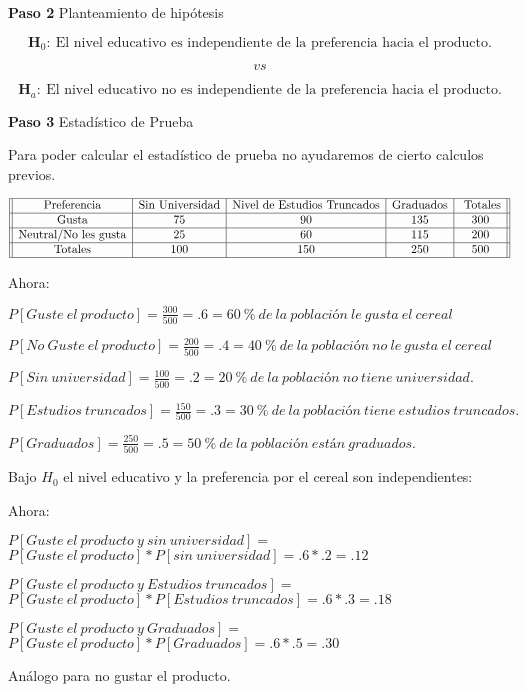 \documentclass[
  a4paper,
  oneside,
  openany]{book}
\begin{document}
\textbf{Paso 2} Planteamiento de hipótesis

\[\textbf{H}_0: \ \mbox{El nivel educativo es independiente de la preferencia hacia el producto.}\]

\[vs\]

\[\textbf{H}_a:\ \mbox{El nivel educativo no es independiente de la preferencia hacia el producto.}\]

\textbf{Paso 3} Estadístico de Prueba

Para poder calcular el estadístico de prueba no ayudaremos de cierto calculos previos.

\[
\begin{array}{||c| c| c |c |c||} 
\hline 
\mbox{Preferencia}& \mbox{Sin Universidad}&\mbox{Nivel de Estudios Truncados}&\mbox{Graduados} &\mbox{ Totales} \\  
 \hline
\mbox{Gusta}&75&90&135&300\\
 \hline
\mbox{Neutral/No les gusta}&25&60&115&200\\
 \hline
\mbox{Totales}&100&150&250&500\\
 \hline
\end{array}
\]

Ahora:

\(P[Guste\ el\ producto]= \frac{300}{500}=.6= 60\ \%\ de\ la\ población\ le\ gusta\ el\ cereal\)

\(P[No\ Guste\ el\ producto]= \frac{200}{500}=.4= 40\ \%\ de\ la\ población\ no\ le\ gusta\ el\ cereal\)

\(P[Sin\ universidad]= \frac{100}{500}=.2= 20\ \%\ de\ la\ población\ no\ tiene\ universidad.\)

\(P[Estudios\ truncados]= \frac{150}{500}=.3= 30\ \%\ de\ la\ población\ tiene\ estudios\ truncados.\)

\(P[Graduados]= \frac{250}{500}=.5= 50\ \%\ de\ la\ población\ están\ graduados.\)

Bajo \(H_0\) el nivel educativo y la preferencia por el cereal son independientes:

Ahora:

\(P[Guste\ el\ producto\ y\ sin\ universidad]=\)
\(P[Guste\ el\ producto]*P[sin\ universidad]=.6*.2=.12\)

\(P[Guste\ el\ producto\ y\ Estudios\ truncados]=\)
\(P[Guste\ el\ producto]*P[Estudios\ truncados]=.6*.3=.18\)

\(P[Guste\ el\ producto\ y\ Graduados]=\)
\(P[Guste\ el\ producto]*P[Graduados]=.6*.5=.30\)

Análogo para no gustar el producto.
\end{document}
